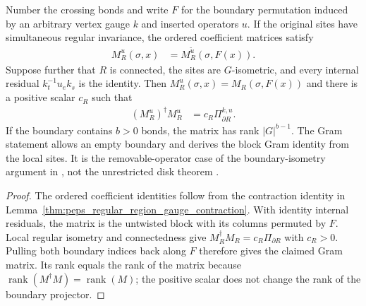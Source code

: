 \begin{lemma}%
    \label{thm:peps_regular_region_gauge_gram}
    \leanok
    Number the crossing bonds and write $F$ for the boundary permutation
    induced by an arbitrary vertex gauge $k$ and inserted operators $u$.
    If the original sites have simultaneous regular invariance, the
    ordered coefficient matrices satisfy
    \begin{align}
        M_R^u(\sigma,x) & =M_R^{\widetilde u}(\sigma,F(x)).
    \end{align}
    Suppose further that $R$ is connected, the sites are $G$-isometric,
    and every internal residual $k_t^{-1}u_ek_s$ is the identity.
    Then $M_R^u(\sigma,x)=M_R(\sigma,F(x))$ and there is a positive
    scalar $c_R$ such that
    \begin{align}
        (M_R^u)^\dagger M_R^u & =c_R\Pi_{\partial R}^{k,u}.
    \end{align}
    If the boundary contains $b>0$ bonds, the matrix has rank
    $|G|^{b-1}$. The Gram statement allows an empty boundary and derives the block Gram
    identity from the local sites. It is the removable-operator case of
    the boundary-isometry argument in \cite[Theorem~6.9]{Schuch2010PEPS},
    not the unrestricted disk theorem
    \cite{gap:rmp_peps_quantum_double_g_isometry}.
\end{lemma}

\begin{proof}\leanok
    The ordered coefficient identities follow from the contraction
    identity in Lemma~\ref{thm:peps_regular_region_gauge_contraction}.
    With identity internal residuals, the matrix is the untwisted block
    with its columns permuted by $F$. Local regular isometry and
    connectedness give $M_R^\dagger M_R=c_R\Pi_{\partial R}$ with $c_R>0$.
    Pulling both boundary indices back along $F$ therefore gives the
    claimed Gram matrix. Its rank equals the rank of the matrix
    because $\operatorname{rank}(M^\dagger M)=\operatorname{rank}(M)$;
    the positive scalar does not change the rank of the boundary projector.
\end{proof}

